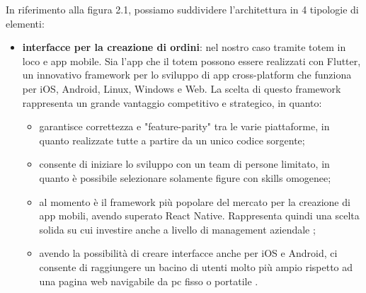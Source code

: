 \documentclass[a4paper, titlepage, 12pt, openright, twoside]{book}
\begin{document}
In riferimento alla figura 2.1, possiamo suddividere l'architettura in 4 tipologie di elementi:
\begin{itemize}
	\item \textbf{interfacce per la creazione di ordini}: nel nostro caso tramite totem in loco e app mobile. Sia l'app che il totem possono essere realizzati con Flutter, un innovativo framework per lo sviluppo di app cross-platform che funziona per iOS, Android, Linux, Windows e Web. La scelta di questo framework rappresenta un grande
				 vantaggio competitivo e strategico, in quanto:
				 \begin{itemize}
				 	\item garantisce correttezza e "feature-parity" tra le varie piattaforme, in quanto realizzate tutte a partire da un unico codice sorgente;
				 	\item consente di iniziare lo sviluppo con un team di persone limitato, in quanto è possibile selezionare solamente figure con skills omogenee;
				 	\item al momento è il framework più popolare del mercato per la creazione di app mobili, avendo superato React Native. Rappresenta quindi una scelta solida su cui investire anche a livello di management aziendale \cite{flutterreact};
				    \item avendo la possibilità di creare interfacce anche per iOS e Android, ci consente di raggiungere un bacino di utenti molto più ampio rispetto ad una pagina web
				    	  navigabile da pc fisso o portatile \cite{hardwaremob}.
				 \end{itemize}
				 

\end{itemize}
\end{document}
